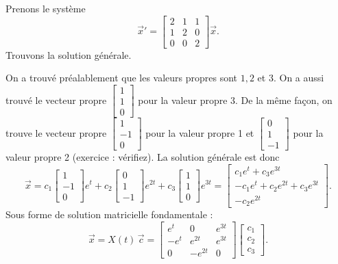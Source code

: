 \begin{example}
Prenons le système
\begin{equation*}
{\vec{x}}'
=
\begin{bmatrix}
2 & 1 & 1 \\
1 & 2 & 0 \\
0 & 0 & 2
\end{bmatrix}
\vec{x} .
\end{equation*}
Trouvons la solution générale.

On a trouvé préalablement que les valeurs propres sont $1,2$ et $3$. On a aussi trouvé le vecteur propre
$\left[ \begin{smallmatrix} 1 \\ 1 \\ 0 \end{smallmatrix} \right]$
pour la valeur propre 3. De la même façon, on trouve le vecteur propre 
$\left[ \begin{smallmatrix} 1 \\ -1 \\ 0 \end{smallmatrix} \right]$
pour la valeur propre 1 et 
$\left[ \begin{smallmatrix} 0 \\ 1 \\ -1 \end{smallmatrix} \right]$
pour la valeur propre 2 (exercice : vérifiez). La solution générale est donc
\begin{equation*}
\vec{x} =
c_1
\begin{bmatrix}
1 \\ -1 \\ 0
\end{bmatrix}
e^t
+
c_2
\begin{bmatrix}
0 \\ 1 \\ -1
\end{bmatrix}
e^{2t}
+
c_3
\begin{bmatrix}
1 \\ 1 \\ 0
\end{bmatrix}
e^{3t} 
=
\begin{bmatrix}
c_1 e^t+c_3 e^{3t} \\ -c_1 e^t + c_2 e^{2t} + c_3 e^{3t} \\ - c_2 e^{2t}
\end{bmatrix} .
\end{equation*}
Sous forme de solution matricielle fondamentale :
\begin{equation*}
\vec{x} = X(t)\, \vec{c}
=
\begin{bmatrix}
e^t & 0 & e^{3t} \\
-e^t & e^{2t} & e^{3t} \\
0 & -e^{2t} & 0
\end{bmatrix}
\begin{bmatrix}
c_1 \\ c_2 \\ c_3
\end{bmatrix} .
\end{equation*}
\end{example}

